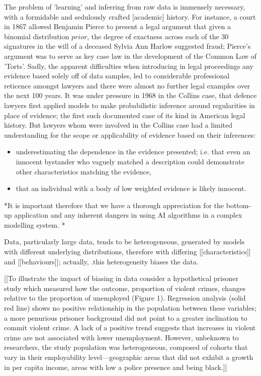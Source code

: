 \documentclass[7pt]{article}
\begin{document}
The problem of 'learning' and inferring from raw data is immensely necessary, with a formidable and sedulously crafted [academic] history. For instance, a court in 1867 allowed Benjamin Pierce to present a legal argument that given a binomial distribution $prior$, the degree of exactness across each of the 30 signatures in the will of a deceased Sylvia Ann Harlow suggested fraud; Pierce's argument was to serve as key case law in the development of the Common Law of 'Torts'. Sadly, the apparent difficulties when introducing in legal proceedings any evidence based solely off of data samples, led to considerable professional reticence amongst lawyers and there were almost no further legal examples over the next 100 years. It was under pressure in 1968 in the Collins case, that defence lawyers first applied models to make probabilistic inference around regularities in place of evidence; the first such documented case of its kind in American legal history. But lawyers whom were involved in the Collins case had a limited understanding for the scope or applicability of evidence based on their inferences: 
\begin{itemize}

\item underestimating the dependence in the evidence presented; i.e. that even an innocent bystander who vaguely matched a description could demonstrate other characteristics matching the evidence, \\
\item that an individual with a body of low weighted evidence is likely innocent. 

\end{itemize}

*It is important therefore that we have a thorough appreciation for the bottom-up application and any inherent dangers in using AI algorithms in a  complex modelling system. *

Data, particularly large data, tends to be heterogeneous, generated by models with different underlying distributions, therefore with differing [[characteristics]] and [[behaviours]]; actually, .this heterogeneity biases the data. 


[[To illustrate the impact of biasing in data consider a hypothetical prisoner study which measured how the outcome, proportion of violent crimes, changes relative to the proportion of unemployed (Figure 1). Regression analysis (solid red line) shows no positive relationship in the population between these variables; a more penurious prisoner background did not point to a greater inclination to commit violent crime. A lack of a positive trend suggests that increases in violent crime are not associated with lower unemployment. However, unbeknown to researchers, the study population was heterogeneous, composed of cohorts that vary in their employability level—geographic areas that did not exhibit a growth in per capita income, areas with low a police presence and being black.]]
 
\end{document}
